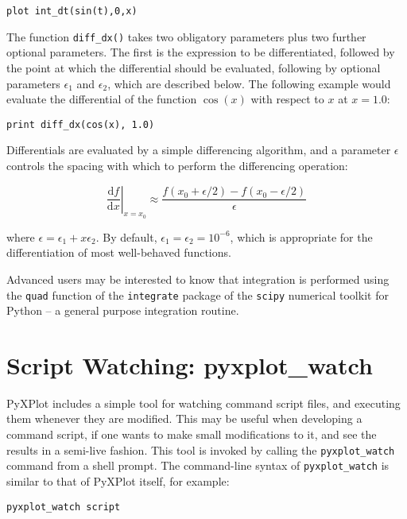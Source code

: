 \documentclass[a4paper,onecolumn,11pt]{book}
\begin{document}
\begin{verbatim}
plot int_dt(sin(t),0,x)
\end{verbatim} 

The function \texttt{diff\_dx()} takes two obligatory parameters plus two
further optional parameters. The first is the expression to be differentiated,
followed by the point at which the differential should be evaluated, following
by optional parameters $\epsilon_1$ and $\epsilon_2$, which are described
below.  The following example would evaluate the differential of the function
$\cos(x)$ with respect to $x$ at $x=1.0$:

\begin{verbatim}
print diff_dx(cos(x), 1.0)
\end{verbatim}

Differentials are evaluated by a simple differencing algorithm, and a parameter
$\epsilon$ controls the spacing with which to perform the differencing
operation:

\begin{displaymath}
\left.\frac{\mathrm{d}f}{\mathrm{d}x}\right|_{x=x_0} \approx \frac{f(x_0+\epsilon/2) - f(x_0-\epsilon/2)}{\epsilon}
\end{displaymath}

\noindent where $\epsilon = \epsilon_1 + x \epsilon_2$. By default, $\epsilon_1
= \epsilon_2 = 10^{-6}$, which is appropriate for the differentiation of most
well-behaved functions.

Advanced users may be interested to know that integration is performed using
the \texttt{quad} function of the \texttt{integrate} package of the
\texttt{scipy} numerical toolkit for Python -- a general purpose integration
routine.

\section{Script Watching: pyxplot\_watch}

PyXPlot includes a simple tool for watching command script files, and executing
them whenever they are modified. This may be useful when developing a command
script, if one wants to make small modifications to it, and see the results in
a semi-live fashion. This tool is invoked by calling the
\texttt{pyxplot\_watch} command
from a shell prompt. The command-line syntax of \texttt{pyxplot\_watch} is
similar to that of PyXPlot itself, for example:

\begin{verbatim}
pyxplot_watch script
\end{verbatim}
\end{document}

